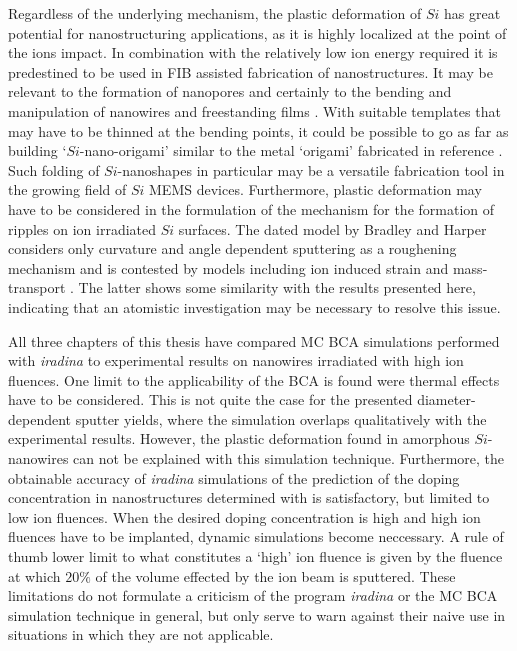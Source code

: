Regardless of the underlying mechanism, the plastic deformation of $Si$ has great potential for nanostructuring applications, as it is highly localized at the point of the ions impact. In combination with the relatively low ion energy required it is predestined to be used in FIB assisted fabrication of nanostructures. It may be relevant to the formation of nanopores \cite{george_nanopore_2010} and certainly to the bending and manipulation of nanowires \cite{cui_ion-beam-induced_2013} and freestanding films \cite{kim_focused_2006}. With suitable templates that may have to be thinned at the bending points, it could be possible to go as far as building `$Si$-nano-origami' similar to the metal `origami' fabricated in reference \cite{chalapat_self-organized_2013}. Such folding of $Si$-nanoshapes in particular may be a versatile fabrication tool in the growing field of $Si$ MEMS devices. Furthermore, plastic deformation may have to be considered in the formulation of the mechanism for the formation of ripples on ion irradiated $Si$ surfaces. The dated model by Bradley and Harper \cite{bradley_theory_1988} considers only curvature and angle dependent sputtering as a roughening mechanism and is contested by models including ion induced strain and mass-transport \cite{norris_stress-induced_2012,kramczynski_wavelength-dependent_2014}. The latter shows some similarity with the results presented here, indicating that an atomistic investigation may be necessary to resolve this issue.

All three chapters of this thesis have compared MC BCA simulations performed with \emph{iradina} to experimental results on nanowires irradiated with high ion fluences. One limit to the applicability of the BCA is found were thermal effects have to be considered. This is not quite the case for the presented diameter-dependent sputter yields, where the simulation overlaps qualitatively with the experimental results. However, the plastic deformation found in amorphous $Si$-nanowires can not be explained with this simulation technique. Furthermore, the obtainable accuracy of \emph{iradina} simulations of the prediction of the doping concentration in nanostructures determined with is satisfactory, but limited to low ion fluences. When the desired doping concentration is high and high ion fluences have to be implanted, dynamic simulations become neccessary. A rule of thumb lower limit to what constitutes a `high' ion fluence is given by the fluence at which $20\%$ of the volume effected by the ion beam is sputtered. These limitations do not formulate a criticism of the program \emph{iradina} or the MC BCA simulation technique in general, but only serve to warn against their naive use in situations in which they are not applicable.
 



